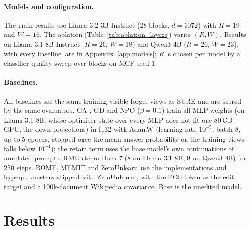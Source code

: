 \documentclass{article}
\theoremstyle{remark}
\theoremstyle{definition}
\begin{document}
\paragraph{Models and configuration.}
The main results use Llama-3.2-3B-Instruct \citep{grattafiori2024llama3} (28 blocks, $d=3072$) with $R=19$ and $W=16$. The ablation (Table~\ref{tab:ablation_layers}) varies $(R,W)$. Results on Llama-3.1-8B-Instruct ($R=20$, $W=18$) and Qwen3-4B \citep{yang2025qwen3} ($R=26$, $W=23$), with every baseline, are in Appendix~\ref{app:models}; $R$ is chosen per model by a classifier-quality sweep over blocks on MCF seed 1.

\paragraph{Baselines.}
All baselines see the same training-visible forget views as SURE and are scored by the same evaluators. GA \citep{jang2023knowledgeunlearning}, GD \citep{liu2022gd} and NPO \citep{zhang2024npo} ($\beta=0.1$) train all MLP weights (on Llama-3.1-8B, whose optimiser state over every MLP does not fit one 80\,GB GPU, the down projections) in fp32 with AdamW (learning rate $10^{-5}$, batch 8, up to 5 epochs, stopped once the mean answer probability on the training views falls below $10^{-4}$); the retain term uses the base model's own continuations of unrelated prompts. RMU \citep{li2024wmdp} steers block 7 (8 on Llama-3.1-8B, 9 on Qwen3-4B) for 250 steps. ROME, MEMIT and ZeroUnlearn use the implementations and hyperparameters shipped with ZeroUnlearn \citep{lin2026zerounlearn}, with the EOS token as the edit target and a 100k-document Wikipedia covariance. Base is the unedited model.

\section{Results}
\label{sec:results}
\end{document}
